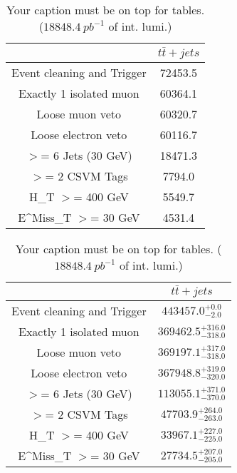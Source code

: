 \documentclass{article}
\begin{document}
\begin{table}
\caption{Your caption must be on top for tables. ($18848.4~pb^{-1}$ of int. lumi.)}
\label{tab:}
\centering
\begin{tabular}{|c|c|}
\toprule
&$t\bar{t}+jets$	\\

\midrule
Event cleaning and Trigger&	72453.5	\\

Exactly 1 isolated muon&	60364.1	\\

Loose muon veto&	60320.7	\\

Loose electron veto&	60116.7	\\

$>$= 6 Jets (30 GeV)&	18471.3	\\

$>$= 2 CSVM Tags&	7794.0	\\

H_{T} $>$=  400 GeV&	5549.7	\\

E^{Miss}_{T} $>$=  30 GeV&	4531.4	\\

\bottomrule
\end{tabular}
\end{table}
\begin{table}
\caption{Your caption must be on top for tables. ($18848.4~pb^{-1}$ of int. lumi.)}
\label{tab:}
\centering
\begin{tabular}{|c|c|}
\toprule
&$t\bar{t}+jets$	\\

\midrule
Event cleaning and Trigger&	$443457.0^{+0.0}_{-2.0}$	\\

Exactly 1 isolated muon&	$369462.5^{+316.0}_{-318.0}$	\\

Loose muon veto&	$369197.1^{+317.0}_{-318.0}$	\\

Loose electron veto&	$367948.8^{+319.0}_{-320.0}$	\\

$>$= 6 Jets (30 GeV)&	$113055.1^{+371.0}_{-370.0}$	\\

$>$= 2 CSVM Tags&	$47703.9^{+264.0}_{-263.0}$	\\

H_{T} $>$=  400 GeV&	$33967.1^{+227.0}_{-225.0}$	\\

E^{Miss}_{T} $>$=  30 GeV&	$27734.5^{+207.0}_{-205.0}$	\\

\bottomrule
\end{tabular}
\end{table}
\end{document}
